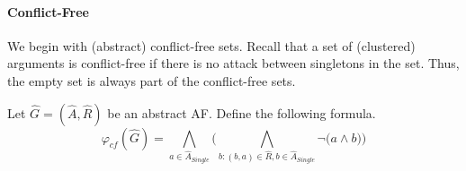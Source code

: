 \paragraph{Conflict-Free} We begin with (abstract) conflict-free sets. Recall that a set of (clustered) arguments is conflict-free if there is no attack between singletons in the set. Thus, the empty set is always part of the conflict-free sets.
\begin{definition}
    Let $\hat{G}=(\hat{A},\hat{R})$ be an abstract AF. Define the following formula.
        \[ \varphi_{cf}(\hat{G}) =
        \bigwedge_{a \in \hat{A}_{\mathit{Single}}} \bigl( \bigwedge_{b:(b,a)\in \hat{R}, b \in \hat{A}_{\mathit{Single}}} \lnot \bigl( a \wedge b \bigl) \bigl)
        \]
    \label{def:booleanFormulaConflictFree}
\end{definition}


